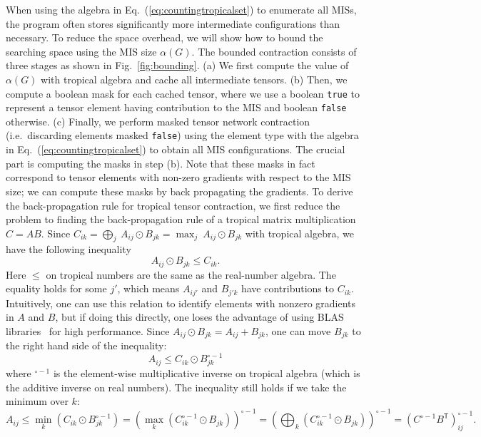 \documentclass[onefignum, onetabnum]{siamart190516}
\newcommand{\<}{\langle}
\renewcommand{\>}{\rangle}
\newcommand{\Eq}[1]{Eq.~(\ref{#1})}
\newcommand{\Fig}[1]{Fig.~\ref{#1}}
\begin{document}
When using the algebra in \Eq{eq:countingtropicalset} to enumerate all MISs, the program often stores significantly more intermediate configurations than necessary.
To reduce the space overhead, we will show how to bound the searching space using the MIS size $\alpha(G)$.
The bounded contraction consists of three stages as shown in \Fig{fig:bounding}. (a) We first compute the value of $\alpha(G)$ with tropical algebra and cache all intermediate tensors.
(b) Then, we compute a boolean mask for each cached tensor, where we use a boolean \texttt{true} to represent a tensor element having contribution to the MIS and boolean \texttt{false} otherwise.
(c) Finally, we perform masked tensor network contraction (i.e.\ discarding elements masked \texttt{false}) using the element type with the algebra in \Eq{eq:countingtropicalset} to obtain all MIS configurations.
The crucial part is computing the masks in step (b). Note that these masks in fact correspond to tensor elements with non-zero gradients with respect to the MIS size; we can compute these masks by back propagating the gradients.
To derive the back-propagation rule for tropical tensor contraction,
we first reduce the problem to finding the back-propagation rule of a tropical matrix multiplication $C = A B$.
Since $ C_{ik} = \bigoplus_{j} \ A_{ij} \odot B_{jk} = \max_{j} \ A_{ij} \odot B_{jk}$ with tropical algebra, we have the following inequality
\begin{equation}
    A_{ij} \odot B_{jk} \leq C_{ik}.
\end{equation}
Here $\leq$ on tropical numbers are the same as the real-number algebra.
The equality holds for some $j'$, which means $A_{ij'}$ and $B_{j'k}$ have contributions to $C_{ik}$.
Intuitively, one can use this relation to identify elements with nonzero gradients in $A$ and $B$,
but if doing this directly, one loses the advantage of using BLAS libraries~\cite{TropicalGEMM} for high performance.
Since $A_{ij} \odot B_{jk} = A_{ij} + B_{jk}$, one can move $B_{jk}$ to the right hand side of the inequality: 
\begin{equation}
    A_{ij} \leq C_{ik} \odot B_{jk}^{\circ -1}
\end{equation}
where ${}^{\circ -1}$ is the element-wise multiplicative inverse on tropical algebra (which is the additive inverse on real numbers).
The inequality still holds if we take the minimum over $k$: 
\begin{equation}
    A_{ij} \leq \min_{k}(C_{ik} \odot B_{jk}^{\circ -1}) = \left(\max_{k} \left(C_{ik}^{\circ -1} \odot B_{jk} \right) \right)^{\circ -1} = \left(\bigoplus_{k} \left(C_{ik}^{\circ -1} \odot B_{jk} \right) \right)^{\circ -1} = \left( C^{\circ-1} B^{\mathsf{T}} \right)^{\circ -1}_{ij}.
\end{equation}
\end{document}

